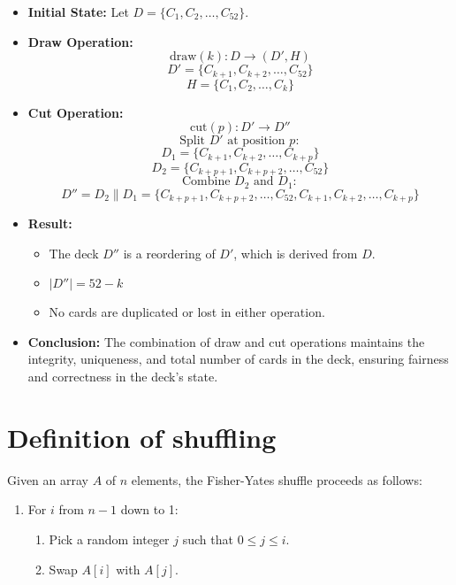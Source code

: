 \documentclass{article}
\begin{document}
\begin{itemize}
    \item \textbf{Initial State:} Let \( D = \{C_1, C_2, \ldots, C_{52}\} \).

    \item \textbf{Draw Operation:}
    \[
    \text{draw}(k) : D \rightarrow (D', H)
    \]
    \[
    D' = \{C_{k+1}, C_{k+2}, \ldots, C_{52}\}
    \]
    \[
    H = \{C_1, C_2, \ldots, C_k\}
    \]

    \item \textbf{Cut Operation:}
    \[
    \text{cut}(p) : D' \rightarrow D''
    \]
    \[
    \text{Split } D' \text{ at position } p:
    \]
    \[
    D_1 = \{C_{k+1}, C_{k+2}, \ldots, C_{k+p}\}
    \]
    \[
    D_2 = \{C_{k+p+1}, C_{k+p+2}, \ldots, C_{52}\}
    \]
    \[
    \text{Combine } D_2 \text{ and } D_1:
    \]
    \[
    D'' = D_2 \| D_1 = \{C_{k+p+1}, C_{k+p+2}, \ldots, C_{52}, C_{k+1}, C_{k+2}, \ldots, C_{k+p}\}
    \]

    \item \textbf{Result:}
    \begin{itemize}
        \item The deck \( D'' \) is a reordering of \( D' \), which is derived from \( D \).
        \item \( |D''| = 52 - k \)
        \item No cards are duplicated or lost in either operation.
    \end{itemize}

    \item \textbf{Conclusion:} The combination of draw and cut operations maintains the integrity, uniqueness, and total number of cards in the deck, ensuring fairness and correctness in the deck's state.
\end{itemize}

\section{Definition of shuffling}
Given an array \( A \) of \( n \) elements, the Fisher-Yates shuffle proceeds as follows:

\begin{enumerate}
    \item For \( i \) from \( n-1 \) down to 1:
    \begin{enumerate}
        \item Pick a random integer \( j \) such that \( 0 \leq j \leq i \).
        \item Swap \( A[i] \) with \( A[j] \).
    \end{enumerate}
\end{enumerate}
\end{document}
